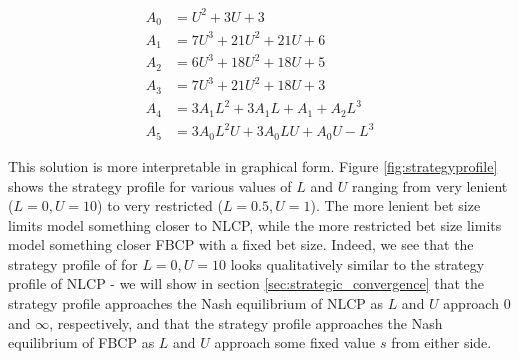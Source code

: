 \documentclass[a4paper,12pt]{article}
\theoremstyle{plain}
\theoremstyle{definition}
\begin{document}
\begin{align*}
	A_0 &= U^2+3 U+3 \\
    A_1 &= 7 U^3+21 U^2+21 U+6 \\
    A_2 &= 6 U^3+18 U^2+18 U+5 \\
    A_3 &= 7 U^3+21 U^2+18 U+3 \\
    A_4 &= 3 A_1 L^2+3 A_1 L+A_1+A_2 L^3 \\
    A_5 &= 3 A_0 L^2 U+3 A_0 L U+A_0 U-L^3
\end{align*}

This solution is more interpretable in graphical form. Figure \ref{fig:strategyprofile} shows the strategy profile for various values of $L$ and $U$ ranging from very lenient ($L=0, U=10$) to very restricted ($L=0.5, U=1$). The more lenient bet size limits model something closer to NLCP, while the more restricted bet size limits model something closer FBCP with a fixed bet size. Indeed, we see that the strategy profile of for $L=0, U=10$ looks qualitatively similar to the strategy profile of NLCP - we will show in section \ref{sec:strategic_convergence} that the strategy profile approaches the Nash equilibrium of NLCP as $L$ and $U$ approach $0$ and $\infty$, respectively, and that the strategy profile approaches the Nash equilibrium of FBCP as $L$ and $U$ approach some fixed value $s$ from either side.
\end{document}
